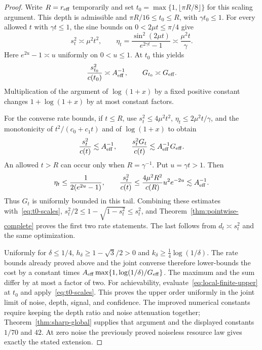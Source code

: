 \begin{proof}
Write $R=r_{\mathrm{eff}}$ temporarily and set
$t_0=\max\{1,\lfloor\pi R/8\rfloor\}$ for this scaling argument.
This depth is admissible and
$\pi R/16\leq t_0\leq R$, with $\gamma t_0\leq1$.
For every allowed $t$ with $\gamma t\leq1$, the sine bounds on
$0<2\mu t\leq\pi/4$ give
\begin{equation}\label{eq:local-effective-scales}
 s_t^2\asymp\mu^2t^2,\qquad
 \eta_t=\frac{\sin^2(2\mu t)}{e^{2\gamma t}-1}
        \asymp\frac{\mu^2t}{\gamma}.
\end{equation}
Here $e^{2u}-1\asymp u$ uniformly on $0<u\leq1$.
At $t_0$ this yields
\begin{equation}\label{eq:t0-scales}
 \frac{s_{t_0}^2}{c(t_0)}\asymp A_{\rm eff}^{-1},\qquad
 G_{t_0}\asymp G_{\rm eff}.
\end{equation}
Multiplication of the argument of $\log(1+x)$ by a fixed positive
constant changes $1+\log(1+x)$ by at most constant factors.

For the converse rate bounds, if $t\leq R$, use
$s_t^2\leq4\mu^2t^2$, $\eta_t\leq2\mu^2t/\gamma$, and the
monotonicity of $t^2/(c_0+c_1t)$ and of $\log(1+x)$ to obtain
\[
 \frac{s_t^2}{c(t)}\lesssim A_{\rm eff}^{-1},\qquad
 \frac{s_t^2G_t}{c(t)}\lesssim
                A_{\rm eff}^{-1}G_{\rm eff}.
\]
An allowed $t>R$ can occur only when $R=\gamma^{-1}$. Put
$u=\gamma t>1$. Then
\[
 \eta_t\leq\frac1{2(e^{2u}-1)},\qquad
 \frac{s_t^2}{c(t)}\leq
 \frac{4\mu^2R^2}{c(R)}u^2e^{-2u}\lesssim A_{\rm eff}^{-1}.
\]
Thus $G_t$ is uniformly bounded in this tail. Combining these estimates
with~\eqref{eq:t0-scales},
$s_t^2/2\leq1-\sqrt{1-s_t^2}\leq s_t^2$, and
Theorem~\ref{thm:pointwise-complete} proves the first two rate statements.
The last follows from $d_t\asymp s_t^2$ and the same optimization.

Uniformly for $\delta\leq1/4$,
$h_\delta\geq1-\sqrt3/2>0$ and
$k_\delta\geq\tfrac14\log(1/\delta)$. The rate bounds already proved
above and the joint converse therefore
lower-bounds the cost by a constant times
$A_{\rm eff}\max\{1,\log(1/\delta)/G_{\rm eff}\}$.
The maximum and the sum differ by at most a factor of two.
For achievability, evaluate~\eqref{eq:local-finite-upper} at $t_0$
and apply~\eqref{eq:t0-scales}. This proves the upper order uniformly
in the joint limit of noise, depth, signal, and confidence.
The improved numerical constants require keeping the depth ratio and
noise attenuation together; Theorem~\ref{thm:sharp-global} supplies that
argument and the displayed constants $1/70$ and $42$.
At zero noise
the previously proved noiseless resource law gives exactly the stated
extension.
\end{proof}

